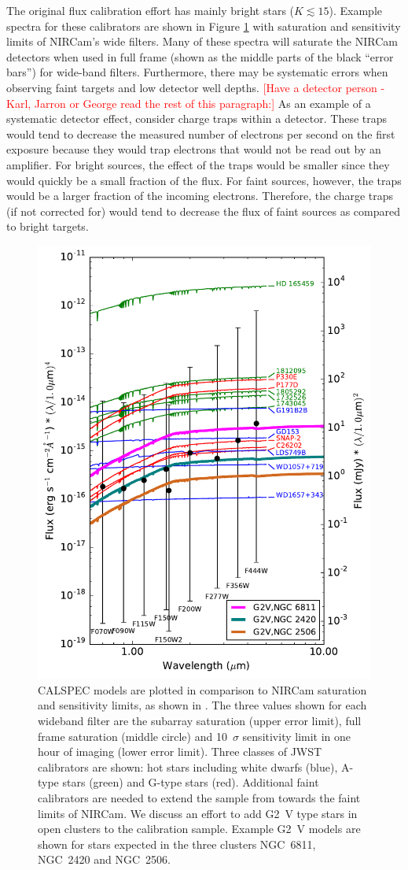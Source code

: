\documentclass{aastex6}
\begin{document}
The original flux calibration effort has mainly bright stars ($K \lesssim 15$).
Example spectra for these calibrators are shown in Figure \ref{fig:JWSTcalsWideF} with saturation and sensitivity limits of NIRCam's wide filters.
Many of these spectra will saturate the NIRCam detectors when used in full frame (shown as the middle parts of the black ``error bars'') for wide-band filters.
Furthermore, there may be systematic errors when observing faint targets and low detector well depths.
\textcolor{red}{[Have a detector person - Karl, Jarron or George read the rest of this paragraph:]}
As an example of a systematic detector effect, consider charge traps within a detector.
These traps would tend to decrease the measured number of electrons per second on the first exposure because they would trap electrons  that would not be read out by an amplifier.
For bright sources, the effect of the traps would be smaller since they would quickly be a small fraction of the flux.
For faint sources, however, the traps would be a larger fraction of the incoming electrons.
Therefore, the charge traps (if not corrected for) would tend to decrease the flux of faint sources as compared to bright targets.

\begin{figure}[!hbtp]
\centering
\includegraphics[width=.48\columnwidth]{calspec_and_new_clust.pdf}
\caption{CALSPEC models are plotted in comparison to NIRCam saturation and sensitivity limits, as shown in \citet{gordon2011fluxplan2}.
The three values shown for each wideband filter are the subarray saturation (upper error limit), full frame saturation (middle circle) and 10~$\sigma$ sensitivity limit in one hour of imaging (lower error limit).
Three classes of JWST calibrators are shown: hot stars including white dwarfs (blue), A-type stars (green) and G-type stars (red).
Additional faint calibrators are needed to extend the sample from \citet{gordon2011fluxplan2} towards the faint limits of NIRCam.
We discuss an effort to add G2~V type stars in open clusters to the calibration sample.
Example G2~V \citet{castelli2004models} models are shown for stars expected in the three clusters NGC~6811, NGC~2420 and NGC~2506.
}\label{fig:JWSTcalsWideF}
\end{figure}
\end{document}
